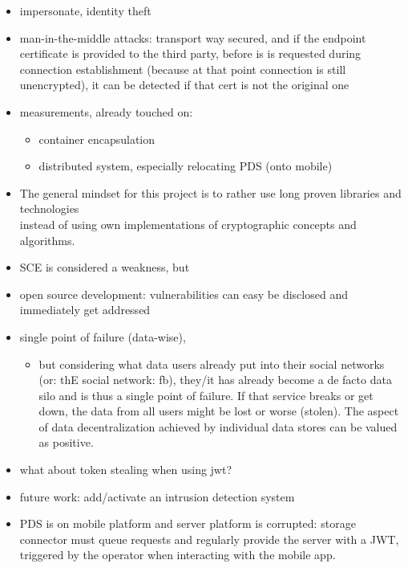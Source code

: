 \documentclass[12pt,english,a4paper,titlepage,cleardoublepage=empty,dottedtoc]{report}
\providecommand{\tightlist}{%
  \setlength{\itemsep}{0pt}\setlength{\parskip}{0pt}}
\begin{document}
\begin{itemize}
\item
  impersonate, identity theft
\item
  man-in-the-middle attacks: transport way secured, and if the endpoint
  certificate is provided to the third party, before is is requested
  during connection establishment (because at that point connection is
  still unencrypted), it can be detected if that cert is not the
  original one
\item
  measurements, already touched on:

  \begin{itemize}
  \tightlist
  \item
    container encapsulation
  \item
    distributed system, especially relocating PDS (onto mobile)
  \end{itemize}
\item
  The general mindset for this project is to rather use long proven
  libraries and technologies\\
  instead of using own implementations of cryptographic concepts and
  algorithms.
\item
  SCE is considered a weakness, but
\item
  open source development: vulnerabilities can easy be disclosed and
  immediately get addressed
\item
  single point of failure (data-wise),

  \begin{itemize}
  \tightlist
  \item
    but considering what data users already put into their social
    networks (or: thE social network: fb), they/it has already become a
    de facto data silo and is thus a single point of failure. If that
    service breaks or get down, the data from all users might be lost or
    worse (stolen). The aspect of data decentralization achieved by
    individual data stores can be valued as positive.
  \end{itemize}
\item
  what about token stealing when using jwt?
\item
  future work: add/activate an intrusion detection system
\item
  PDS is on mobile platform and server platform is corrupted: storage
  connector must queue requests and regularly provide the server with a
  JWT, triggered by the operator when interacting with the mobile app.
\end{itemize}
\end{document}
